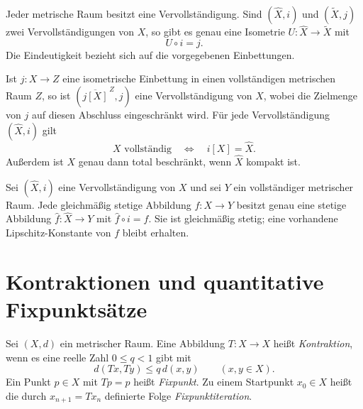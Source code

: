 \begin{theorem}
\label{b47guide:thm:completion-existence}
Jeder metrische Raum besitzt eine Vervollständigung.
Sind $(\widehat X,i)$ und $(\widetilde X,j)$ zwei Vervollständigungen
von $X$, so gibt es genau eine Isometrie
$U:\widehat X\to\widetilde X$ mit
\[
 U\circ i=j.
\]
Die Eindeutigkeit bezieht sich auf die vorgegebenen Einbettungen.
\cite{completion-notes}
\end{theorem}

\begin{theorem}
\label{b47guide:thm:completion-closure}
Ist $j:X\to Z$ eine isometrische Einbettung in einen vollständigen
metrischen Raum $Z$, so ist $(\overline{j[X]}^{\,Z},j)$ eine
Vervollständigung von $X$, wobei die Zielmenge von $j$ auf diesen
Abschluss eingeschränkt wird.
Für jede Vervollständigung $(\widehat X,i)$ gilt
\[
 X\text{ vollständig}\quad\Longleftrightarrow\quad i[X]=\widehat X.
\]
Außerdem ist $X$ genau dann total beschränkt, wenn $\widehat X$
kompakt ist.
\cite{completion-notes}
\end{theorem}

\begin{theorem}[Fortsetzungscharakterisierung]
\label{b47guide:thm:completion-universal}
Sei $(\widehat X,i)$ eine Vervollständigung von $X$ und sei $Y$
ein vollständiger metrischer Raum. Jede gleichmäßig stetige
Abbildung $f:X\to Y$ besitzt genau eine stetige Abbildung
$\widehat f:\widehat X\to Y$ mit $\widehat f\circ i=f$.
Sie ist gleichmäßig stetig; eine vorhandene Lipschitz-Konstante
von $f$ bleibt erhalten.
\cite{completion-notes}
\end{theorem}

\section{Kontraktionen und quantitative Fixpunktsätze}

\begin{definition}
\label{b47guide:def:contraction}
Sei $(X,d)$ ein metrischer Raum. Eine Abbildung $T:X\to X$ heißt
\emph{Kontraktion}, wenn es eine reelle Zahl $0\leq q<1$ gibt mit
\[
 d(Tx,Ty)\leq q\,d(x,y)\qquad(x,y\in X).
\]
Ein Punkt $p\in X$ mit $Tp=p$ heißt \emph{Fixpunkt}.
Zu einem Startpunkt $x_0\in X$ heißt die durch $x_{n+1}=Tx_n$
definierte Folge \emph{Fixpunktiteration}.
\end{definition}

